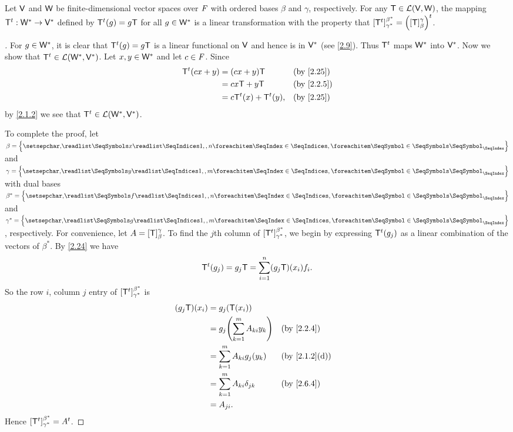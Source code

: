 \begin{thm}\label{2.25}
	Let \(\mathsf{V}\) and \(\mathsf{W}\) be finite-dimensional vector spaces over \(\mathit{F}\) with ordered bases \(\beta\) and \(\gamma\), respectively.
	For any \(\mathsf{T} \in \mathcal{L}(\mathsf{V}, \mathsf{W})\), the mapping \({\mathsf{T}}^{t} : \mathsf{W}^* \to \mathsf{V}^*\) defined by \({\mathsf{T}}^{t}(g) = g \mathsf{T}\) for all \(g \in \mathsf{W}^*\) is a linear transformation with the property that \([{\mathsf{T}}^{t}]_{\gamma^*}^{\beta^*} = {\left\lparen[\mathsf{T}]_{\beta}^{\gamma}\right\rparen}^{t}\).
\end{thm}

\begin{proof}[]
	For \(g \in \mathsf{W}^*\), it is clear that \({\mathsf{T}}^{t}(g) = g \mathsf{T}\) is a linear functional on \(\mathsf{V}\) and hence is in \(\mathsf{V}^*\) (see \cref{2.9}).
	Thus \({\mathsf{T}}^{t}\) maps \(\mathsf{W}^*\) into \(\mathsf{V}^*\).
	Now we show that \({\mathsf{T}}^{t} \in \mathcal{L}(\mathsf{W}^*, \mathsf{V}^*)\).
	Let \(x, y \in \mathsf{W}^*\) and let \(c \in \mathit{F}\).
	Since
	\begin{align*}
		\tp{\T}(cx + y) & = (cx + y) \T                &  & \by{2.25}  \\
		                & = c x \T + y \T              &  & \by{2.2.5} \\
		                & = c \tp{\T}(x) + \tp{\T}(y), &  & \by{2.25}
	\end{align*}
	by \cref{2.1.2} we see that \({\mathsf{T}}^{t} \in \mathcal{L}(\mathsf{W}^*, \mathsf{V}^*)\).

	To complete the proof, let \(\beta = \set{\seq{x}{1,,n}}\) and \(\gamma = \set{\seq{y}{1,,m}}\) with dual bases \(\beta^* = \set{\seq{f}{1,,n}}\) and \(\gamma^* = \set{\seq{g}{1,,m}}\), respectively.
	For convenience, let \(A = [\mathsf{T}]_{\beta}^{\gamma}\).
	To find the \(j\)th column of \([{\mathsf{T}}^{t}]_{\gamma^*}^{\beta^*}\), we begin by expressing \({\mathsf{T}}^{t}(g_j)\) as a linear combination of the vectors of \(\beta^*\).
	By \cref{2.24} we have
	\[
		{\mathsf{T}}^{t}(g_j) = g_j \mathsf{T} = \sum_{i = 1}^n (g_j \mathsf{T})(x_i) f_i.
	\]
	So the row \(i\), column \(j\) entry of \([{\mathsf{T}}^{t}]_{\gamma^*}^{\beta^*}\) is
	\begin{align*}
		(g_j \T)(x_i) & = g_j(\T(x_i))                                           \\
		              & = g_j \pa{\sum_{k = 1}^m A_{k i} y_k} &  & \by{2.2.4}    \\
		              & = \sum_{k = 1}^m A_{k i} g_j(y_k)     &  & \by{2.1.2}[d] \\
		              & = \sum_{k = 1}^m A_{k i} \delta_{j k} &  & \by{2.6.4}    \\
		              & = A_{j i}.
	\end{align*}
	Hence \([{\mathsf{T}}^{t}]_{\gamma^*}^{\beta^*} = {A}^{t}\).
\end{proof}

